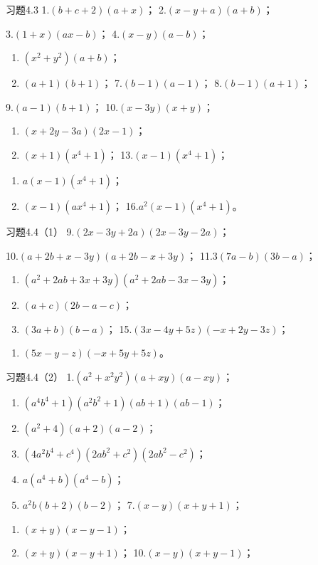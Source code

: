 习题4.3 1.\((b + c + 2)(a + x)\)； 2.\((x - y + a)(a + b)\)；

3.\((1 + x)(ax - b)\)； 4.\((x - y)(a - b)\)；
\begin{enumerate}[start=5]
\item
  \((x^2 + y^2)(a + b)\)；
\item
  \((a + 1)(b + 1)\)； 7.\((b - 1)(a - 1)\)； 8.\((b - 1)(a + 1)\)；
\end{enumerate}

9.\((a - 1)(b + 1)\)； 10.\((x - 3y)(x + y)\)；
\begin{enumerate}[start=11]
\item
  \((x + 2y - 3a)(2x - 1)\)；
\item
  \((x + 1)(x^4 + 1)\)； 13.\((x - 1)(x^4 + 1)\)；
\end{enumerate}
\begin{enumerate}[start=14]
\item
  \(a(x - 1)(x^4 + 1)\)；
\item
  \((x - 1)(ax^4 + 1)\)； 16.\(a^2(x - 1)(x^4 + 1)\)。
\end{enumerate}

习题4.4（1） 9.\((2x - 3y + 2a)(2x - 3y - 2a)\)；

10.\((a + 2b + x - 3y)(a + 2b - x + 3y)\)； 11.\(3(7a - b)(3b - a)\)；

\begin{enumerate}[start=12]
\item
  \((a^2 + 2ab + 3x + 3y)(a^2 + 2ab - 3x - 3y)\)；
\item
  \((a + c)(2b - a - c)\)；
\item
  \((3a + b)(b - a)\)； 15.\((3x - 4y + 5z)(-x + 2y - 3z)\)；
\end{enumerate}

\begin{enumerate}[start=16]
\item
  \((5x - y - z)(-x + 5y + 5z)\)。
\end{enumerate}

习题4.4（2） 1.\((a^2 + x^2y^2)(a + xy)(a - xy)\)；

\begin{enumerate}[start=2]
\item
  \((a^4 b^4 + 1)(a^2 b^2 + 1)(ab + 1)(ab - 1)\)；
\item
  \((a^2 + 4)(a + 2)(a - 2)\)；
\item
  \((4a^{2}b^{4} + c^{4})(2ab^{2} + c^{2})(2ab^{2} - c^{2})\)；
\item
  \(a(a^4 + b)(a^4 - b)\)；
\item
  \(a^2 b(b + 2)(b - 2)\)； 7.\((x - y)(x + y + 1)\)；
\end{enumerate}
\begin{enumerate}[start=8]
\item
  \((x + y)(x - y - 1)\)；
\item
  \((x + y)(x - y + 1)\)； 10.\((x - y)(x + y - 1)\)；
\end{enumerate}

